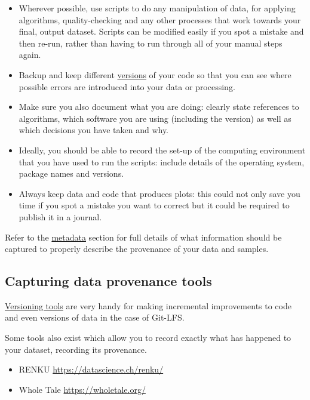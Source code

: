 \documentclass[12pt,a4paper,oneside]{report}
\providecommand{\tightlist}{%
  \setlength{\itemsep}{0pt}\setlength{\parskip}{0pt}}
\begin{document}
\begin{itemize}
\tightlist
\item
  Wherever possible, use scripts to do any manipulation of data, for
  applying algorithms, quality-checking and any other processes that
  work towards your final, output dataset. Scripts can be modified
  easily if you spot a mistake and then re-run, rather than having to
  run through all of your manual steps again.
\item
  Backup and keep different
  \protect\hyperlink{versioning-tools}{versions} of your code so that
  you can see where possible errors are introduced into your data or
  processing.
\item
  Make sure you also document what you are doing: clearly state
  references to algorithms, which software you are using (including the
  version) as well as which decisions you have taken and why.
\item
  Ideally, you should be able to record the set-up of the computing
  environment that you have used to run the scripts: include details of
  the operating system, package names and versions.
\item
  Always keep data and code that produces plots: this could not only
  save you time if you spot a mistake you want to correct but it could
  be required to publish it in a journal.
\end{itemize}

Refer to the \protect\hyperlink{metadata}{metadata} section for full
details of what information should be captured to properly describe the
provenance of your data and samples.

\hypertarget{capturing-data-provenance-tools}{%
\subsection{Capturing data provenance
tools}\label{capturing-data-provenance-tools}}

\protect\hyperlink{versioning-tools}{Versioning tools} are very handy
for making incremental improvements to code and even versions of data in
the case of Git-LFS.

Some tools also exist which allow you to record exactly what has
happened to your dataset, recording its provenance.

\begin{itemize}
\tightlist
\item
  RENKU \url{https://datascience.ch/renku/}
\item
  Whole Tale \url{https://wholetale.org/}
\end{itemize}
\end{document}
